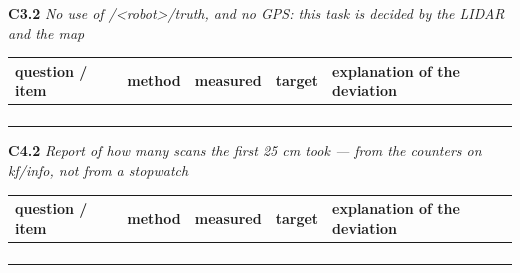 \documentclass[a4paper,10pt]{article}
\begin{document}
\vspace{4pt}\noindent\textbf{C3.2} \emph{No use of /<robot>/truth, and no GPS: this task is decided by the LIDAR and the map}

\begin{tabular}{|>{\raggedright\hyphenpenalty 500\arraybackslash}p{2.87cm}|>{\raggedright\hyphenpenalty 500\arraybackslash}p{2.28cm}|>{\raggedright\hyphenpenalty 500\arraybackslash}p{2.87cm}|>{\raggedright\hyphenpenalty 500\arraybackslash}p{2.28cm}|>{\raggedright\hyphenpenalty 500\arraybackslash}p{3.70cm}|}
\hline
\textbf{question / item} & \textbf{method} & \textbf{measured} & \textbf{target} & \textbf{explanation of the deviation} \\
\hline
\rule{0pt}{2.4em} & \rule{0pt}{2.4em} & \rule{0pt}{2.4em} & \rule{0pt}{2.4em} & \rule{0pt}{2.4em} \\
\rule{0pt}{2.4em} & \rule{0pt}{2.4em} & \rule{0pt}{2.4em} & \rule{0pt}{2.4em} & \rule{0pt}{2.4em} \\
\rule{0pt}{2.4em} & \rule{0pt}{2.4em} & \rule{0pt}{2.4em} & \rule{0pt}{2.4em} & \rule{0pt}{2.4em} \\
\rule{0pt}{2.4em} & \rule{0pt}{2.4em} & \rule{0pt}{2.4em} & \rule{0pt}{2.4em} & \rule{0pt}{2.4em} \\
\hline
\end{tabular}

\vspace{4pt}\noindent\textbf{C4.2} \emph{Report of how many scans the first 25 cm took --- from the counters on kf/info, not from a stopwatch}

\begin{tabular}{|>{\raggedright\hyphenpenalty 500\arraybackslash}p{2.87cm}|>{\raggedright\hyphenpenalty 500\arraybackslash}p{2.28cm}|>{\raggedright\hyphenpenalty 500\arraybackslash}p{2.87cm}|>{\raggedright\hyphenpenalty 500\arraybackslash}p{2.28cm}|>{\raggedright\hyphenpenalty 500\arraybackslash}p{3.70cm}|}
\hline
\textbf{question / item} & \textbf{method} & \textbf{measured} & \textbf{target} & \textbf{explanation of the deviation} \\
\hline
\rule{0pt}{2.4em} & \rule{0pt}{2.4em} & \rule{0pt}{2.4em} & \rule{0pt}{2.4em} & \rule{0pt}{2.4em} \\
\rule{0pt}{2.4em} & \rule{0pt}{2.4em} & \rule{0pt}{2.4em} & \rule{0pt}{2.4em} & \rule{0pt}{2.4em} \\
\rule{0pt}{2.4em} & \rule{0pt}{2.4em} & \rule{0pt}{2.4em} & \rule{0pt}{2.4em} & \rule{0pt}{2.4em} \\
\rule{0pt}{2.4em} & \rule{0pt}{2.4em} & \rule{0pt}{2.4em} & \rule{0pt}{2.4em} & \rule{0pt}{2.4em} \\
\hline
\end{tabular}
\end{document}
